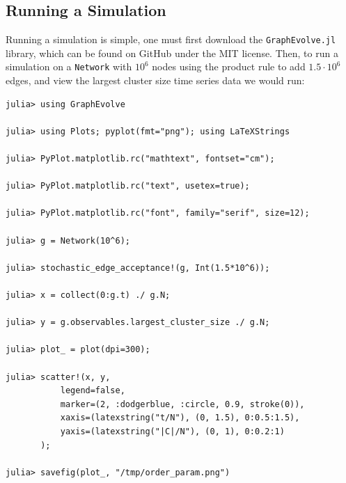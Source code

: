 \subsection{Running a Simulation}
Running a simulation is simple, one must first download the \texttt{GraphEvolve.jl} library, which can be found on GitHub under the MIT license.
Then, to run a simulation on a \texttt{Network} with $10^6$ nodes using the product rule to add $1.5 \cdot 10^6$ edges, and view the largest cluster size time series data we would run:

\begin{lstlisting}
julia> using GraphEvolve

julia> using Plots; pyplot(fmt="png"); using LaTeXStrings

julia> PyPlot.matplotlib.rc("mathtext", fontset="cm");

julia> PyPlot.matplotlib.rc("text", usetex=true);

julia> PyPlot.matplotlib.rc("font", family="serif", size=12);

julia> g = Network(10^6);

julia> stochastic_edge_acceptance!(g, Int(1.5*10^6));

julia> x = collect(0:g.t) ./ g.N;

julia> y = g.observables.largest_cluster_size ./ g.N;

julia> plot_ = plot(dpi=300);

julia> scatter!(x, y,
           legend=false,
           marker=(2, :dodgerblue, :circle, 0.9, stroke(0)),
           xaxis=(latexstring("t/N"), (0, 1.5), 0:0.5:1.5),
           yaxis=(latexstring("|C|/N"), (0, 1), 0:0.2:1)
       );

julia> savefig(plot_, "/tmp/order_param.png")
\end{lstlisting}
